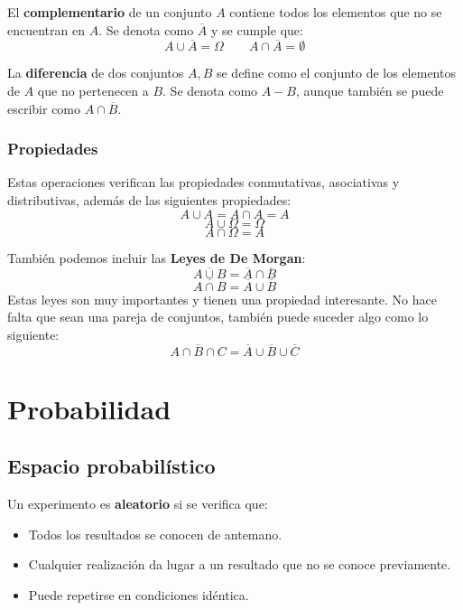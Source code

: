 \documentclass[a4paper]{book}
\begin{document}
\begin{definicion}
	El \textbf{complementario} de un conjunto $A$ contiene todos los elementos que no se encuentran en $A$. Se denota como $\overline{A}$ y se cumple que: \[A \cup \overline{A} = \Omega \qquad A \cap \overline{A} = \emptyset\]
\end{definicion}

\begin{definicion}
	La \textbf{diferencia} de dos conjuntos $A, B$ se define como el conjunto de los elementos de $A$ que no pertenecen a $B$. Se denota como $A-B$, aunque también se puede escribir como $A\cap \overline{B}$.
\end{definicion}

\subsection*{Propiedades}
Estas operaciones verifican las propiedades conmutativas, asociativas y distributivas, además de las siguientes propiedades:
\[A \cup A = A \cap A = A\]
\[A\cup \Omega = \Omega \]
\[A \cap \Omega = A\]

También podemos incluir las \textbf{Leyes de De Morgan}: \[\overline{A\cup B} = \overline{A} \cap \overline{B}\]
\[\overline{A\cap B} = \overline{A} \cup \overline{B}\]
Estas leyes son muy importantes y tienen una propiedad interesante. No hace falta que sean una pareja de conjuntos, también puede suceder algo como lo siguiente: \[\overline{A\cap B \cap C} = \overline{A} \cup \overline{B} \cup \overline{C}\]

\chapter{Probabilidad}


\section{Espacio probabilístico}
\begin{definicion}
	Un experimento es \textbf{aleatorio} si se verifica que: \begin{itemize}
		\item Todos los resultados se conocen de antemano.
		\item Cualquier realización da lugar a un resultado que no se conoce previamente.
		\item Puede repetirse en condiciones idéntica.
	\end{itemize}
\end{definicion}
\end{document}
